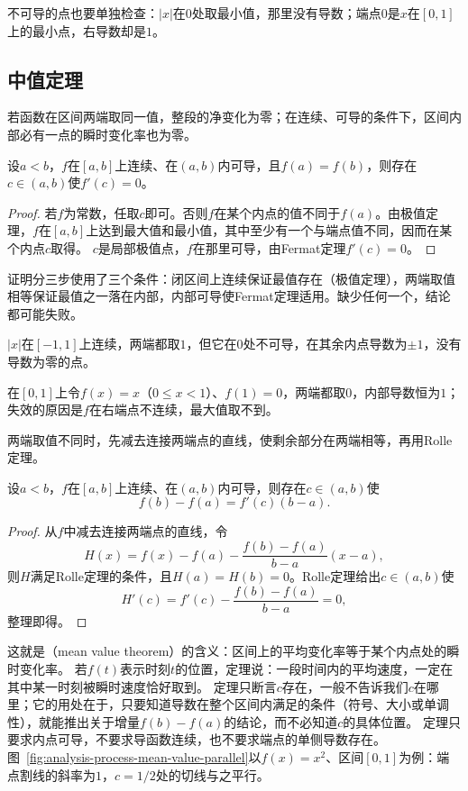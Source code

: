 不可导的点也要单独检查：$|x|$在$0$处取最小值，那里没有导数；端点$0$是$x$在$[0,1]$上的最小点，右导数却是$1$。

\subsection{中值定理}
\label{sec:ru-mean-value-theorems}

若函数在区间两端取同一值，整段的净变化为零；在连续、可导的条件下，区间内部必有一点的瞬时变化率也为零。
\begin{theorem}[Rolle定理]
\label{thm:analysis-rolle}
设$a<b$，$f$在$[a,b]$上连续、在$(a,b)$内可导，且$f(a)=f(b)$，则存在$c\in(a,b)$使$f'(c)=0$。
\end{theorem}
\begin{proof}
若$f$为常数，任取$c$即可。否则$f$在某个内点的值不同于$f(a)$。由极值定理，$f$在$[a,b]$上达到最大值和最小值，其中至少有一个与端点值不同，因而在某个内点$c$取得。
$c$是局部极值点，$f$在那里可导，由Fermat定理$f'(c)=0$。
\end{proof}
证明分三步使用了三个条件：闭区间上连续保证最值存在（极值定理），两端取值相等保证最值之一落在内部，内部可导使Fermat定理适用。缺少任何一个，结论都可能失败。
\begin{example}[Rolle定理的条件]
\label{ex:ru-rolle-conditions}
$|x|$在$[-1,1]$上连续，两端都取$1$，但它在$0$处不可导，在其余内点导数为$\pm1$，没有导数为零的点。

在$[0,1]$上令$f(x)=x$（$0\leq x<1$）、$f(1)=0$，两端都取$0$，内部导数恒为$1$；失效的原因是$f$在右端点不连续，最大值取不到。
\end{example}

两端取值不同时，先减去连接两端点的直线，使剩余部分在两端相等，再用Rolle定理。
\begin{theorem}[Lagrange中值定理]
\label{thm:analysis-lagrange-mean-value}
设$a<b$，$f$在$[a,b]$上连续、在$(a,b)$内可导，则存在$c\in(a,b)$使
\begin{equation}
 f(b)-f(a)=f'(c)(b-a).
 \label{eq:analysis-mean-value-theorem}
\end{equation}
\end{theorem}
\begin{proof}
从$f$中减去连接两端点的直线，令
\[
 H(x)=f(x)-f(a)-\frac{f(b)-f(a)}{b-a}(x-a),
\]
则$H$满足Rolle定理的条件，且$H(a)=H(b)=0$。Rolle定理给出$c\in(a,b)$使
\[
 H'(c)=f'(c)-\frac{f(b)-f(a)}{b-a}=0,
\]
整理即得。
\end{proof}
这就是（mean value theorem）的含义：区间上的平均变化率等于某个内点处的瞬时变化率。
若$f(t)$表示时刻$t$的位置，定理说：一段时间内的平均速度，一定在其中某一时刻被瞬时速度恰好取到。
定理只断言$c$存在，一般不告诉我们$c$在哪里；它的用处在于，只要知道导数在整个区间内满足的条件（符号、大小或单调性），就能推出关于增量$f(b)-f(a)$的结论，而不必知道$c$的具体位置。
定理只要求内点可导，不要求导函数连续，也不要求端点的单侧导数存在。
图~\ref{fig:analysis-process-mean-value-parallel}以$f(x)=x^2$、区间$[0,1]$为例：端点割线的斜率为$1$，$c=1/2$处的切线与之平行。

